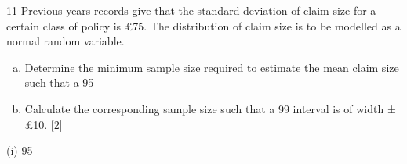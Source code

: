 \documentclass[a4paper,12pt]{article}
\begin{document}
\item 11 Previous years records give that the standard deviation of claim size for a certain
class of policy is £75. The distribution of claim size is to be modelled as a normal
random variable.
\begin{enumerate}[(a)]
\item Determine the minimum sample size required to estimate the mean claim
size such that a 95%
\item Calculate the corresponding sample size such that a 99%
interval is of width ±£10. [2]
\end{enumerate}
(i) 95%
\end{document}
